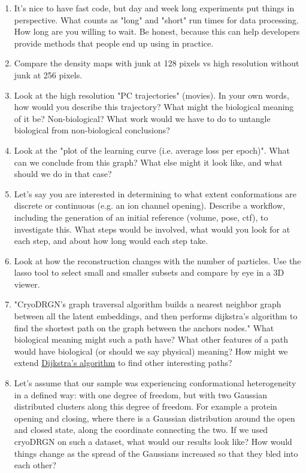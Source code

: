 \documentclass[11pt, oneside]{article}   	%
\begin{document}
\begin{enumerate}
	\item It's nice to have fast code, but day and week long experiments put things in perspective. What counts as "long" and "short" run times for data processing. How long are you willing to wait. Be honest, because this can help developers provide methods that people end up using in practice.
	\item Compare the density maps with junk at 128 pixels vs high resolution without junk at 256 pixels.
	\item Look at the high resolution "PC trajectories" (movies). In your own words, how would you describe this trajectory? What might the biological meaning of it be? Non-biological? What work would we have to do to untangle biological from non-biological conclusions?
	\item Look at the "plot of the learning curve (i.e. average loss per epoch)". What can we conclude from this graph? What else might it look like, and what should we do in that case?
	\item Let's say you are interested in determining to what extent conformations are discrete or continuous (e.g. an ion channel opening). Describe a workflow, including the generation of an initial reference (volume, pose, ctf), to investigate this. What steps would be involved, what would you look for at each step, and about how long would each step take.
	\item Look at how the reconstruction changes with the number of particles.  Use the lasso tool to select small and smaller subsets and compare by eye in a 3D viewer.
	\item "CryoDRGN's graph traversal algorithm builds a nearest neighbor graph between all the latent embeddings, and then performs dijkstra's algorithm to find the shortest path on the graph between the anchors nodes." What biological meaning might such a path have? What other features of a path would have biological (or should we say physical) meaning? How might we extend \href{https://youtu.be/GazC3A4OQTE}{Dijkstra's algorithm} to find other interesting paths?
	\item Let's assume that our sample was experiencing conformational heterogeneity in a defined way: with one degree of freedom, but with two Gaussian distributed clusters along this degree of freedom. For example a protein opening and closing, where there is a Gaussian distribution around the open and closed state, along the coordinate connecting the two. If we used cryoDRGN on such a dataset, what would our results look like? How would things change as the spread of the Gaussians increased so that they bled into each other?

\end{enumerate}
\end{document}
